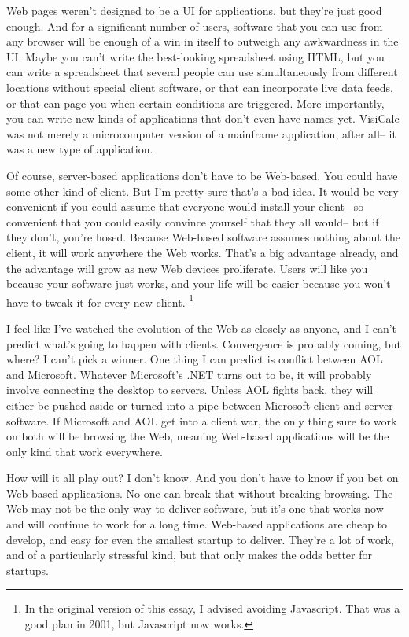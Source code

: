 \documentclass[12pt]{book}
\begin{document}
Web pages weren't designed to be a UI for applications, but they're just
good enough. And for a significant number of users, software that you
can use from any browser will be enough of a win in itself to outweigh
any awkwardness in the UI. Maybe you can't write the best-looking
spreadsheet using HTML, but you can write a spreadsheet that several
people can use simultaneously from different locations without special
client software, or that can incorporate live data feeds, or that can
page you when certain conditions are triggered. More importantly, you
can write new kinds of applications that don't even have names yet.
VisiCalc was not merely a microcomputer version of a mainframe
application, after all-- it was a new type of application.

Of course, server-based applications don't have to be Web-based. You
could have some other kind of client. But I'm pretty sure that's a bad
idea. It would be very convenient if you could assume that everyone
would install your client-- so convenient that you could easily convince
yourself that they all would-- but if they don't, you're hosed. Because
Web-based software assumes nothing about the client, it will work
anywhere the Web works. That's a big advantage already, and the
advantage will grow as new Web devices proliferate. Users will like you
because your software just works, and your life will be easier because
you won't have to tweak it for every new client. \footnote{In the original version of this essay, I advised avoiding
Javascript. That was a good plan in 2001, but Javascript now works.}

I feel like I've watched the evolution of the Web as closely as anyone,
and I can't predict what's going to happen with clients. Convergence is
probably coming, but where? I can't pick a winner. One thing I can
predict is conflict between AOL and Microsoft. Whatever Microsoft's .NET
turns out to be, it will probably involve connecting the desktop to
servers. Unless AOL fights back, they will either be pushed aside or
turned into a pipe between Microsoft client and server software. If
Microsoft and AOL get into a client war, the only thing sure to work on
both will be browsing the Web, meaning Web-based applications will be
the only kind that work everywhere.

How will it all play out? I don't know. And you don't have to know if
you bet on Web-based applications. No one can break that without
breaking browsing. The Web may not be the only way to deliver software,
but it's one that works now and will continue to work for a long time.
Web-based applications are cheap to develop, and easy for even the
smallest startup to deliver. They're a lot of work, and of a
particularly stressful kind, but that only makes the odds better for
startups.
\end{document}
